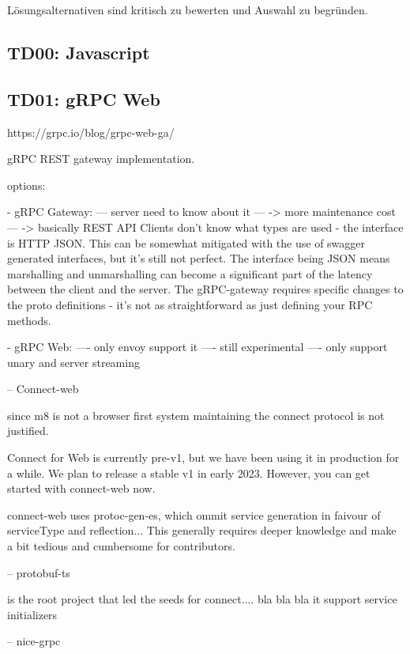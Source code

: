 Lösungsalternativen sind kritisch zu bewerten und Auswahl zu begründen.

\subsection{TD00: Javascript}

\subsection{TD01: gRPC Web}

https://grpc.io/blog/grpc-web-ga/

gRPC REST gateway implementation.

options:

- gRPC Gateway:
--- server need to know about it
--- -> more maintenance cost
--- -> basically REST API
Clients don’t know what types are used - the interface is HTTP JSON. This can be somewhat mitigated with the use of swagger generated interfaces, but it’s still not perfect.
The interface being JSON means marshalling and unmarshalling can become a significant part of the latency between the client and the server.
The gRPC-gateway requires specific changes to the proto definitions - it’s not as straightforward as just defining your RPC methods.

- gRPC Web: 
---- only envoy support it
---- still experimental
---- only support unary and server streaming

-- Connect-web

since m8 is not a browser first system maintaining the connect protocol is not justified. 

Connect for Web is currently pre-v1, but we have been using it in production for a while. We plan to release a stable v1 in early 2023. However, you can get started with connect-web now.

connect-web uses protoc-gen-es, which ommit service generation in faivour of serviceType and reflection... %
This generally requires deeper knowledge and make a bit tedious and cumbersome for contributors. 

-- protobuf-ts

is the root project that led the seeds for connect.... bla bla bla
it support service initializers

-- nice-grpc

